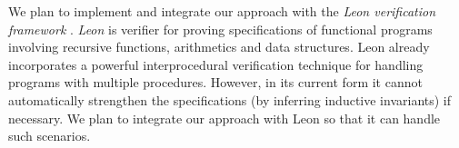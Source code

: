 We plan to implement and integrate our approach with the \emph{Leon verification framework} 
\cite{psuter:SAS11}.
\emph{Leon} is verifier for proving specifications of functional programs involving 
recursive functions, arithmetics and data structures. 
Leon already incorporates a powerful interprocedural verification technique for handling 
programs with multiple procedures.
However, in its current form it cannot automatically  strengthen the specifications (by inferring inductive
invariants) if necessary. We plan to integrate our approach with Leon so that it can handle such scenarios. 